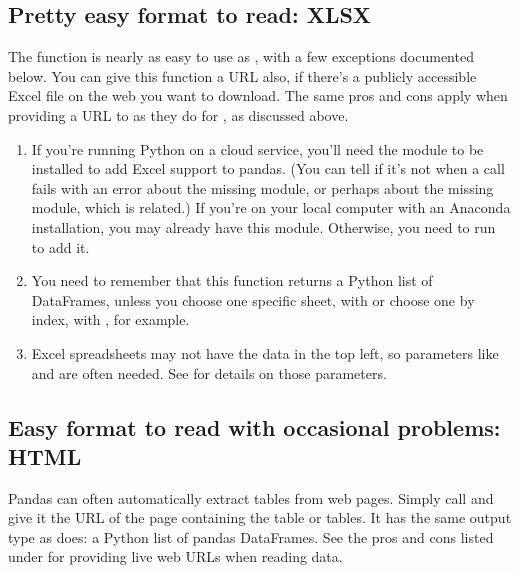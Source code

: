 \documentclass[letterpaper,10pt,english]{jupyterBook}
\begin{document}
\subsection{Pretty easy format to read: XLSX}
\label{\detokenize{chapter-13-etl:pretty-easy-format-to-read-xlsx}}
\sphinxAtStartPar
The  function is nearly as easy to use as , with a few exceptions documented below.  You can give this function a URL also, if there’s a publicly accessible Excel file on the web you want to download.  The same pros and cons apply when providing a URL to  as they do for , as discussed above.
\begin{enumerate}
%
\item {} 
\sphinxAtStartPar
If you’re running Python on a cloud service, you’ll need the  module to be installed to add Excel support to pandas.  (You can tell if it’s not when a  call fails with an error about the missing module, or perhaps about the missing  module, which is related.)  If you’re on your local computer with an Anaconda installation, you may already have this module.  Otherwise, you need to run  to add it.

\item {} 
\sphinxAtStartPar
You need to remember that this function returns a Python list of DataFrames, unless you choose one specific sheet, with  or choose one by index, with , for example.

\item {} 
\sphinxAtStartPar
Excel spreadsheets may not have the data in the top left, so parameters like  and  are often needed.  See  for details on those parameters.

\end{enumerate}


\subsection{Easy format to read with occasional problems: HTML}
\label{\detokenize{chapter-13-etl:easy-format-to-read-with-occasional-problems-html}}
\sphinxAtStartPar
Pandas can often automatically extract tables from web pages.  Simply call  and give it the URL of the page containing the table or tables.  It has the same output type as  does: a Python list of pandas DataFrames.  See the pros and cons listed under  for providing live web URLs when reading data.
\end{document}
